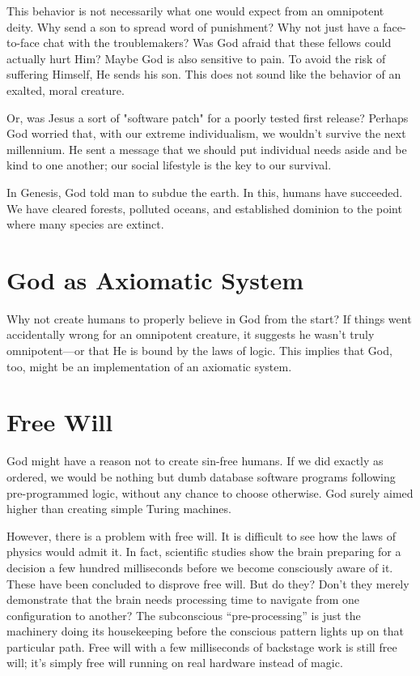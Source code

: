 This behavior is not necessarily what one would expect from an omnipotent deity.
Why send a son to spread word of punishment? Why not just have a face-to-face chat with the troublemakers?
Was God afraid that these fellows could actually hurt Him? Maybe God is also sensitive to pain.
To avoid the risk of suffering Himself, He sends his son.
This does not sound like the behavior of an exalted, moral creature.

Or, was Jesus a sort of "software patch" for a poorly tested first release? Perhaps God worried that, with our extreme individualism, we wouldn't survive the next millennium.
He sent a message that we should put individual needs aside and be kind to one another; our social lifestyle is the key to our survival.

In Genesis, God told man to subdue the earth.
In this, humans have succeeded.
We have cleared forests, polluted oceans, and established dominion to the point where many species are extinct.


\section{God as Axiomatic System}
  
Why not create humans to properly believe in God from the start? If things went accidentally wrong for an omnipotent creature, it suggests he wasn't truly omnipotent—or that He is
bound by the laws of logic. This implies that God, too, might be an implementation of an axiomatic system.


\section{Free Will}

God might have a reason not to create sin-free humans.
If we did exactly as ordered, we would be nothing but dumb database software programs following pre-programmed logic, without any chance to choose otherwise.
God surely aimed higher than creating simple Turing machines.

However, there is a problem with free will. It is difficult to see how the laws of physics would admit it. 
In fact, scientific studies show the brain preparing for a decision a few hundred milliseconds before we become consciously aware of it.
These have been concluded to disprove free will. But do they? Don't they merely demonstrate that the brain needs processing time to navigate from one configuration to another?
The subconscious “pre-processing” is just the machinery doing its housekeeping before the conscious pattern lights up on that particular path.
Free will with a few milliseconds of backstage work is still free will; it’s simply free will running on real hardware instead of magic.

